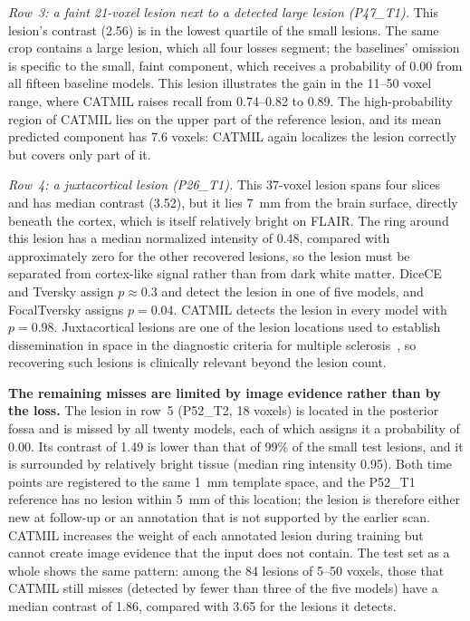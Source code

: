 \emph{Row~3: a faint 21-voxel lesion next to a detected large lesion
(P47\_T1).} This lesion's contrast (2.56) is in the lowest quartile of the
small lesions. The same crop contains a large lesion, which all four
losses segment; the baselines' omission is specific to the small, faint
component, which receives a probability of 0.00 from all fifteen baseline
models. This lesion illustrates the gain in the 11--50 voxel range, where
CATMIL raises recall from 0.74--0.82 to 0.89. The high-probability region
of CATMIL lies on the upper part of the reference lesion, and its mean
predicted component has 7.6 voxels: CATMIL again localizes the lesion
correctly but covers only part of it.

\emph{Row~4: a juxtacortical lesion (P26\_T1).} This 37-voxel lesion spans
four slices and has median contrast (3.52), but it lies 7~mm from the brain
surface, directly beneath the cortex, which is itself relatively bright on
FLAIR. The ring around this lesion has a median normalized intensity of
0.48, compared with approximately zero for the other recovered lesions, so
the lesion must be separated from cortex-like signal rather than from dark
white matter. DiceCE and Tversky assign $p \approx 0.3$ and detect the
lesion in one of five models, and FocalTversky assigns $p = 0.04$. CATMIL
detects the lesion in every model with $p = 0.98$. Juxtacortical lesions
are one of the lesion locations used to establish dissemination in space in
the diagnostic criteria for multiple sclerosis~\cite{thompson_diagnosis_2018},
so recovering such lesions is clinically relevant beyond the lesion count.

\textbf{The remaining misses are limited by image evidence rather than by
the loss.} The lesion in row~5 (P52\_T2, 18 voxels) is located in the
posterior fossa and is missed by all twenty models, each of which assigns
it a probability of 0.00. Its contrast of 1.49 is lower than that of 99\%
of the small test lesions, and it is surrounded by relatively bright tissue
(median ring intensity 0.95). Both time points are registered to the same
1~mm template space, and the P52\_T1 reference has no lesion within 5~mm of
this location; the lesion is therefore either new at follow-up or an
annotation that is not supported by the earlier scan. CATMIL increases the
weight of each annotated lesion during training but cannot create image
evidence that the input does not contain. The test set as a whole shows
the same pattern: among the 84 lesions of 5--50 voxels, those that CATMIL
still misses (detected by fewer than three of the five models) have a
median contrast of 1.86, compared with 3.65 for the lesions it detects.

